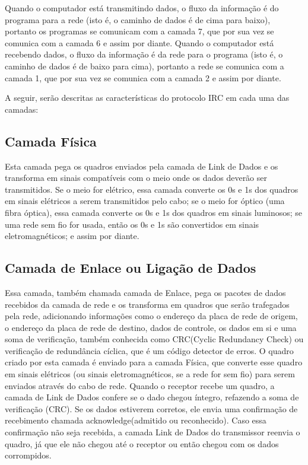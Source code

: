 Quando o computador está transmitindo dados, o fluxo da informação é do programa para a rede (isto é, o caminho de dados é de cima para baixo), portanto os programas se comunicam com a camada 7, que por sua vez se comunica com a camada 6 e assim por diante. Quando o computador está recebendo dados, o fluxo da informação é da rede para o programa (isto é, o caminho de dados é de baixo para cima), portanto a rede se comunica com a camada 1, que por sua vez se comunica com a camada 2 e assim por diante.

A seguir, serão descritas as características do protocolo IRC em cada uma das camadas:

\subsection{Camada Física}

Esta camada pega os quadros enviados pela camada de Link de Dados e os transforma em sinais compatíveis com o meio onde os dados deverão ser transmitidos. Se o meio for elétrico, essa camada converte os 0s e 1s dos quadros em sinais elétricos a serem transmitidos pelo cabo; se o meio for óptico (uma fibra óptica), essa camada converte os 0s e 1s dos quadros em sinais luminosos; se uma rede sem fio for usada, então os 0s e 1s são convertidos em sinais eletromagnéticos; e assim por diante.


\subsection{Camada de Enlace ou Ligação de Dados}

Essa camada, também chamada camada de Enlace, pega os pacotes de dados recebidos da camada de rede e os transforma em quadros que serão trafegados pela rede, adicionando informações como o endereço da placa de rede de origem, o endereço da placa de rede de destino, dados de controle, os dados em si e uma soma de verificação, também conhecida como CRC(Cyclic Redundancy Check) ou verificação de redundância cíclica, que é um código detector de erros. O quadro criado por esta camada é enviado para a camada Física, que converte esse quadro em sinais elétricos (ou sinais eletromagnéticos, se a rede for sem fio) para serem enviados através do cabo de rede. Quando o receptor recebe um quadro, a camada de Link de Dados confere se o dado chegou íntegro, refazendo a soma de verificação (CRC). Se os dados estiverem corretos, ele envia uma confirmação de recebimento chamada acknowledge(admitido ou reconhecido). Caso essa confirmação não seja recebida, a camada Link de Dados do transmissor reenvia o quadro, já que ele não chegou até o receptor ou então chegou com os dados corrompidos.


